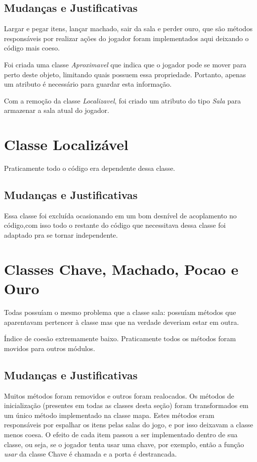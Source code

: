 \documentclass[runningheads,a4paper]{llncs}
\begin{document}
    \subsection{Mudanças e Justificativas}
        Largar e pegar itens, lançar machado, sair da sala e perder ouro, que são métodos responsáveis por realizar ações do jogador foram implementados aqui deixando o código mais coeso.
        
        Foi criada uma classe \emph{Aproximavel} que indica que o jogador pode se mover para perto deste objeto, limitando quais possuem essa propriedade. Portanto, apenas um atributo é necessário para guardar esta informação. 
        
        Com a remoção da classe \emph{Localizavel}, foi criado um atributo do tipo \emph{Sala} para armazenar a sala atual do jogador.

\section{Classe Localizável}
    Praticamente todo o código era dependente dessa classe.

    \subsection{Mudanças e Justificativas}
        Essa classe foi excluída ocasionando em um bom desnível de acoplamento no código,com isso todo o restante do código que necessitava dessa classe foi adaptado pra se tornar independente. 

\section{Classes Chave, Machado, Pocao e Ouro}
    Todas possuíam o mesmo problema que a classe sala: possuíam métodos que aparentavam pertencer à classe mas que na verdade deveriam estar em outra.
    
    Índice de coesão extremamente baixo. Praticamente todos os métodos foram movidos para outros módulos.
    
    \subsection{Mudanças e Justificativas}
        Muitos métodos foram removidos e outros foram realocados. Os métodos de inicialização (presentes em todas as classes desta seção) foram transformados em um único método implementado na classe mapa. Estes métodos eram responsáveis por espalhar os itens pelas salas do jogo, e por isso deixavam a classe menos coesa.
        O efeito de cada item passou a ser implementado dentro de sua classe, ou seja, se o jogador tenta usar uma chave, por exemplo, então a função \emph{usar} da classe Chave é chamada e a porta é destrancada.
        
\end{document}
